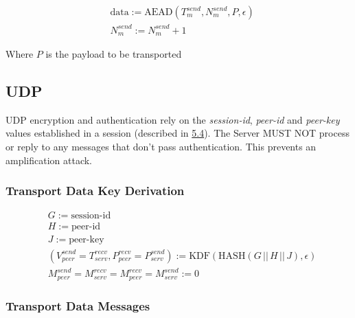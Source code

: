 \documentclass{article}
\begin{document}
    \begin{align*}
        & \text{data} := \text{AEAD}(T_{m}^{send}, N_{m}^{send}, P, \epsilon) \\
        & N_{m}^{send} := N_{m}^{send} + 1
    \end{align*}

    Where $P$ is the payload to be transported

    \subsection{UDP}

    UDP encryption and authentication rely on the \emph{session-id}, \emph{peer-id} and \emph{peer-key} values
    established in a session
    (described in \hyperlink{subsection.5.4}{5.4}). The Server MUST NOT
    process or reply to any messages that don't pass authentication. This prevents an amplification attack.\\

    \subsubsection{Transport Data Key Derivation}

    \begin{align*}
        &  G:= \text{session-id}                                                               \\
        &  H := \text{peer-id}                                                                \\
        &  J := \text{peer-key}                                                              \\
        &  (V_{peer}^{send} = T_{serv}^{recv}, P_{peer}^{recv} = P_{serv}^{send}) := \text{KDF}(\text{HASH}(G\,
        ||\, H\,||\, J), \epsilon)                                        \\
        &   M_{peer}^{send} = M_{serv}^{recv} = M_{peer}^{recv} = M_{serv}^{send} := 0
    \end{align*}

    \subsubsection{Transport Data Messages}
\end{document}
